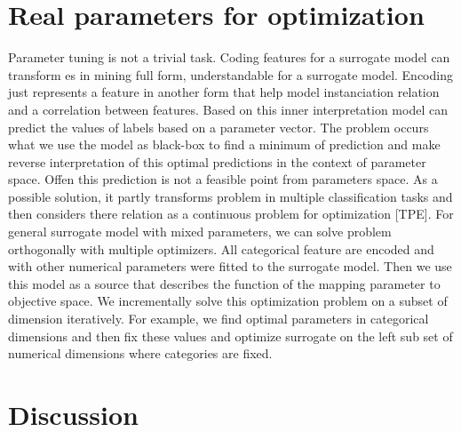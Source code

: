    \section{Real parameters for optimization}
    Parameter tuning is not a trivial task. Coding features for a surrogate model can transform es in mining full form, understandable for a surrogate model. Encoding just represents a feature in another form that help model instanciation relation and a correlation between features. Based on this inner interpretation model can predict the values of labels based on a parameter vector. The problem occurs what we use the model as black-box to find a minimum of prediction and make reverse interpretation of this optimal predictions in the context of parameter space. Offen this prediction is not a feasible point from parameters space. As a possible solution, it partly transforms problem in multiple classification tasks and then considers there relation as a continuous problem for optimization [TPE]. For general surrogate model with mixed parameters, we can solve problem orthogonally with multiple optimizers. All categorical feature are encoded and with other numerical parameters were fitted to the surrogate model. Then we use this model as a source that describes the function of the mapping parameter to objective space.  We incrementally solve this optimization problem on a subset of dimension iteratively. For example, we find optimal parameters in categorical dimensions and then fix these values and optimize surrogate on the left sub set of numerical dimensions where categories are fixed.


    \section{Discussion}


